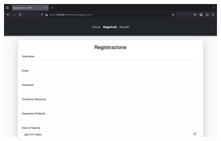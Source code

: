 \documentclass{article}
\begin{document}
\begin{figure}[H]
        \hfill
        \begin{minipage}{0.3\linewidth}
            \centering
            \includegraphics[width=\linewidth]{./content/registrazione.png}
        \end{minipage}

        \vspace{0.3cm} %


\end{figure}
\end{document}
